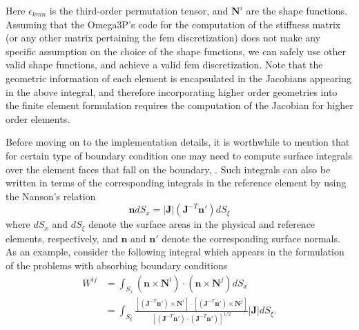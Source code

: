\documentclass[review,12pt]{elsarticle_summary_report}
\newcommand{\bs}[1]{\boldsymbol{#1}}
\newcommand{\pr}[1]{\left( #1 \right)}
\newcommand{\br}[1]{\left[ #1 \right]}
\newcommand{\abs}[1]{\left | #1 \right |}
\begin{document}
Here $\epsilon_{kmn}$ is the third-order permutation tensor, and $\mathbf{N}^i$ are the shape functions. Assuming that the Omega3P's code for the computation of the stiffness matrix (or any other matrix pertaining the fem discretization) does not make any specific assumption on the choice of the shape functions, we can safely use other valid shape functions, and  achieve a valid fem discretization. Note that the geometric information of each element is encapsulated in the Jacobians appearing in the above integral, and therefore incorporating higher order geometries into the finite element formulation requires the computation of the Jacobian for higher order elements.



Before moving on to the implementation details, it is worthwhile to mention that for certain type of boundary condition one may need to compute surface integrals over the element faces that fall on the boundary, \cite[cf. section II.E. in][, for example]{LeeLi_09}. Such integrals can also be written in terms of the corresponding integrals in the reference element by using the Nanson's relation
\begin{equation}
  \mathbf{n} dS _x = \abs{\bs{J}} \pr{\bs{J}^{-T}\mathbf{n}'} dS _{{\xi}}
  \label{Nanson}
\end{equation}
where $dS_x$ and $dS _{\xi}$ denote the surface areas in the physical and reference elements, respectively, and $\mathbf{n}$ and $\mathbf{n}'$ denote the corresponding surface normals. As an example, consider the following integral which appears in the formulation of the problems with absorbing boundary conditions \cite{LeeLi_09}
\begin{equation}
  \begin{aligned}
    W^{ij} &= \int _{S_x} \pr{\mathbf{n} \times \mathbf{N}^i} \cdot \pr{\mathbf{n} \times \mathbf{N}^j} dS_x \\
    &= \int _{S_\xi} \frac{\br{\pr{\bs{J}^{-T} \mathbf{n}'} \times \mathbf{N}^i} \cdot \br{\pr{\bs{J}^{-T} \mathbf{n}'} \times \mathbf{N}^j}}{\br{\pr{\bs{J}^{-T}\mathbf{n}'} \cdot \pr{\bs{J}^{-T}\mathbf{n}'}}^{1/2}} \abs{\bs{J}}  dS_\xi.
  \end{aligned}
\end{equation}
\end{document}
